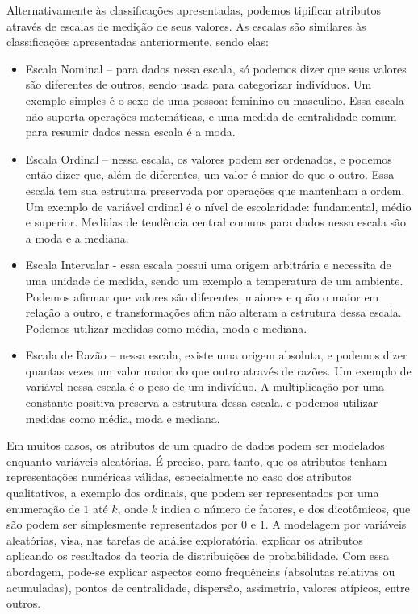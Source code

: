 Alternativamente às classificações apresentadas, podemos tipificar atributos
através de escalas de medição de seus valores.
As escalas são similares às classificações apresentadas anteriormente, sendo elas:

\begin{itemize}
\item Escala Nominal -- para dados nessa escala, só podemos dizer que seus
valores são diferentes de outros, sendo usada para categorizar indivíduos.
Um exemplo simples é o sexo de uma pessoa: feminino ou masculino.
Essa escala não suporta operações matemáticas, e uma medida de centralidade
comum para resumir dados nessa escala é a moda.

\item Escala Ordinal -- nessa escala, os valores podem ser ordenados, e podemos
então dizer que, além de diferentes, um valor é maior do que o outro.
Essa escala tem sua estrutura preservada por operações que mantenham a ordem.
Um exemplo de variável ordinal é o nível de escolaridade: fundamental, médio
e superior. Medidas de tendência central comuns para dados nessa escala são a
moda e a mediana.

\item Escala Intervalar - essa escala possui uma origem arbitrária e necessita
de uma unidade de medida, sendo um exemplo a temperatura de um ambiente.
Podemos afirmar que valores são diferentes, maiores e quão o maior em relação
a outro, e transformações afim não alteram a estrutura dessa escala.
Podemos utilizar medidas como média, moda e mediana.

\item Escala de Razão -- nessa escala, existe uma origem absoluta, e podemos dizer quantas
vezes um valor maior do que outro através de razões.
Um exemplo de variável nessa escala é o peso de um indivíduo.
A multiplicação por uma constante positiva preserva a estrutura dessa escala, e podemos utilizar
medidas como média, moda e mediana.
\end{itemize}

Em muitos casos, os atributos de um quadro de dados podem ser modelados enquanto variáveis
aleatórias.
É preciso, para tanto, que os atributos tenham representações numéricas válidas,
especialmente no caso dos atributos qualitativos, a exemplo dos ordinais, que podem
ser representados por uma enumeração de $1$ até $k$, onde $k$ indica o número de
fatores, e dos dicotômicos, que são podem ser simplesmente representados por $0$ e $1$.
A modelagem por variáveis aleatórias, visa, nas tarefas de análise exploratória,
explicar os atributos aplicando os resultados da teoria de distribuições de probabilidade.
Com essa abordagem, pode-se explicar aspectos como frequências (absolutas relativas ou
acumuladas), pontos de centralidade, dispersão, assimetria, valores atípicos, entre outros.


